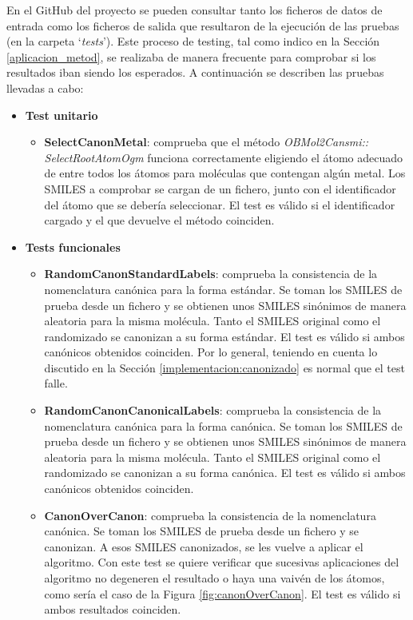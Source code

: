En el GitHub del proyecto se pueden consultar tanto los ficheros de datos de entrada como los ficheros de salida que resultaron de la ejecución de las pruebas (en la carpeta `\textit{tests}'). Este proceso de testing, tal como indico en la Sección \ref{aplicacion_metod}, se realizaba de manera frecuente para comprobar si los resultados iban siendo los esperados. A continuación se describen las pruebas llevadas a cabo:

\begin{itemize}
    \item \textbf{Test unitario}
    \begin{itemize}
        \item \textbf{SelectCanonMetal}: comprueba que el método \textit{OBMol2Cansmi:: SelectRootAtomOgm} funciona correctamente eligiendo el átomo adecuado de entre todos los átomos para moléculas que contengan algún metal. Los SMILES a comprobar se cargan de un fichero, junto con el identificador del átomo que se debería seleccionar. El test es válido si el identificador cargado y el que devuelve el método coinciden.
    \end{itemize}

    \item \textbf{Tests funcionales}
    \begin{itemize}
        \item \textbf{RandomCanonStandardLabels}: comprueba la consistencia de la nomenclatura canónica para la forma estándar. Se toman los SMILES de prueba desde un fichero y se obtienen unos SMILES sinónimos de manera aleatoria para la misma molécula. Tanto el SMILES original como el randomizado se canonizan a su forma estándar. El test es válido si ambos canónicos obtenidos coinciden. Por lo general, teniendo en cuenta lo discutido en la Sección \ref{implementacion:canonizado} es normal que el test falle.

        \item \textbf{RandomCanonCanonicalLabels}: comprueba la consistencia de la nomenclatura canónica para la forma canónica. Se toman los SMILES de prueba desde un fichero y se obtienen unos SMILES sinónimos de manera aleatoria para la misma molécula. Tanto el SMILES original como el randomizado se canonizan a su forma canónica. El test es válido si ambos canónicos obtenidos coinciden.
    
        \item \textbf{CanonOverCanon}: comprueba la consistencia de la nomenclatura canónica. Se toman los SMILES de prueba desde un fichero y se canonizan. A esos SMILES canonizados, se les vuelve a aplicar el algoritmo. Con este test se quiere verificar que sucesivas aplicaciones del algoritmo no degeneren el resultado o haya una vaivén de los átomos, como sería el caso de la Figura \ref{fig:canonOverCanon}. El test es válido si ambos resultados coinciden.


\end{itemize}
\end{itemize}
